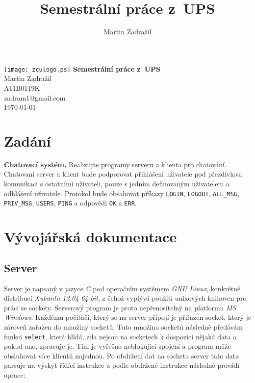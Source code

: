 \documentclass[11pt, titlepage]{article}
\author{Martin Zadražil}
\title{Semestrální práce z~UPS}
\begin{document}
\begin{titlepage}
	\begin{center}
		\texttt{[image: zculogo.ps]}
		\vskip 5cm
		{\huge \bfseries Semestrální práce z~UPS} \\
		\vskip 1cm
		{ \large Martin Zadražil} \\
		{ \large A11B0119K} \\
		{ \large zadram1@gmail.com} \\
		{ \large \today }
	\end{center}
\end{titlepage}

\tableofcontents
\newpage

\section{Zadání}
{\bf Chatovací systém.} Realizujte programy serveru a klienta pro chatování. Chatovaní server a klient bude podporovat přihlášení uživatele pod přezdívkou, komunikaci s ostatními uživateli, pouze s jedním definovaným uživatelem a odhlášení uživatele. Protokol bude obsahovat příkazy \texttt{LOGIN}, \texttt{LOGOUT}, \texttt{ALL\_MSG}, \texttt{PRIV\_MSG}, \texttt{USERS}, \texttt{PING} a odpovědi \texttt{OK} a \texttt{ERR}.

\section{Vývojářská dokumentace}

\subsection{Server}
Server je napsaný v jazyce \textit{C} pod operačním systémem \textit{GNU Linux}, konkrétně distribucí \textit{Xubuntu 12.04 64-bit}, z čehož vyplývá použití unixových knihoven pro práci se sockety. Serverový program je proto nepřenositelný na platformu \textit{MS Windows}.
Každému počítači, který se na server připojí je přiřazen socket, který je zároveň zařazen do množiny socketů. Tuto množinu socketů následně předávám funkci \texttt{select}, která hlídá, zda nejsou na socketech k dospozici nějaká data a pokud ano, zpracuje je. Tím je vyřešno neblokující spojení a program může obsluhovat více klientů najednou.
Po obdržení dat na socketu server tato data parsuje na výskyt řídící instrukce a podle obdržené instrukce následně provádí oprace:
\end{document}
